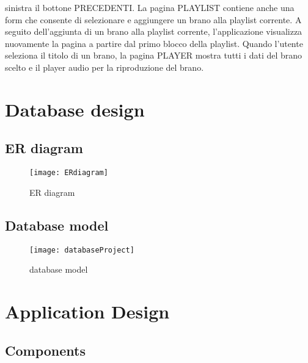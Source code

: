 \documentclass{article}
\begin{document}
sinistra il bottone PRECEDENTI. La pagina PLAYLIST contiene anche una form che consente di selezionare e  aggiungere un brano alla playlist corrente. A seguito dell’aggiunta di un brano alla playlist corrente, l’applicazione visualizza nuovamente la pagina  a partire dal primo blocco della playlist. Quando l’utente seleziona il titolo di un brano, la pagina PLAYER mostra tutti i dati del brano scelto e il player audio per la riproduzione del brano.
 
\section{Database design}

\subsection{ER diagram}
\begin{figure}[h]
\centering
\texttt{[image: ERdiagram]}
\caption{ER diagram}
\label{fig:ERdiagram}
\end{figure}

\newpage

\subsection{Database model}
\begin{figure}[h]
\centering
\texttt{[image: databaseProject]}
\caption{database model}
\label{fig:databaseProject}
\end{figure}
\newpage


\section{Application Design}

\subsection{Components}
\end{document}
